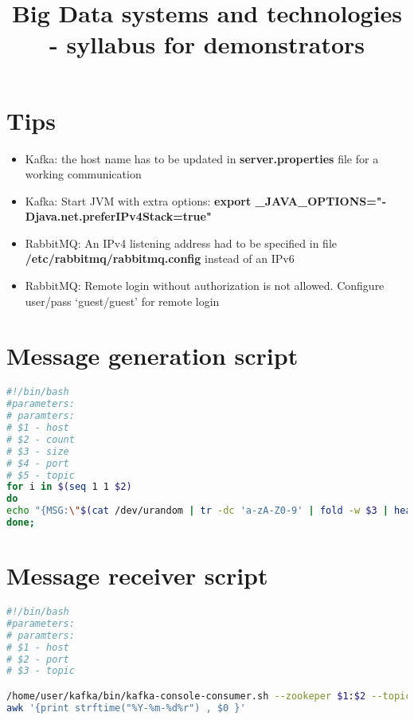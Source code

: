 \documentclass[a4paper]{article}
\title{Big Data systems and technologies - syllabus for demonstrators}
\author{}
\date{}
\begin{document}
\maketitle

\tableofcontents

\section{Tips}

\begin{itemize}
\item Kafka: the host name has to be updated in \textbf{server.properties} file for a working communication
\item Kafka: Start JVM with extra options: \textbf{export \_JAVA\_OPTIONS="­Djava.net.preferIPv4Stack=true" }
\item RabbitMQ: An IPv4 listening address had to be specified in file \textbf{/etc/rabbitmq/rabbitmq.config} instead of an IPv6
\item RabbitMQ: Remote login without authorization is not allowed. Configure user/pass `guest/guest' for remote login
\end{itemize}

\section{Message generation script}
%
\begin{lstlisting}[language=bash,breaklines=true]
#!/bin/bash
#parameters:
# paramters:
# $1 - host
# $2 - count
# $3 - size
# $4 - port
# $5 - topic
for i in $(seq 1 1 $2)
do
echo "{MSG:\"$(cat /dev/urandom | tr -dc 'a-zA-Z0-9' | fold -w $3 | head -n 1)\"}" | /home/user/kafka/bin/kafka-console-producer.sh --broker-list $1:$4 --topic $5 > /dev/null
done;

\end{lstlisting}

\section{Message receiver script}

\begin{lstlisting}[language=bash,breaklines=true]
#!/bin/bash
#parameters:
# paramters:
# $1 - host
# $2 - port
# $3 - topic

/home/user/kafka/bin/kafka-console-consumer.sh --zookeper $1:$2 --topic $3 | \
awk '{print strftime("%Y-%m-%d%r") , $0 }'

\end{lstlisting}
%
\end{document}
